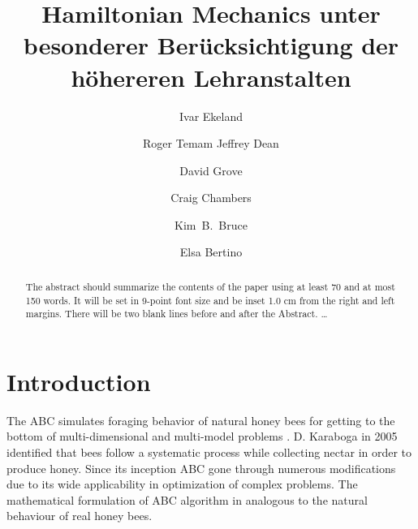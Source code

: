 \documentclass{svproc}
\begin{document}
\mainmatter              %
%
\title{Hamiltonian Mechanics unter besonderer Ber\"ucksichtigung der
h\"ohereren Lehranstalten}
%
%
\author{Ivar Ekeland \and Roger Temam
Jeffrey Dean \and David Grove \and Craig Chambers \and Kim~B.~Bruce \and
Elsa Bertino}
%
%
%

\maketitle              %

\begin{abstract}
The abstract should summarize the contents of the paper
using at least 70 and at most 150 words. It will be set in 9-point
font size and be inset 1.0 cm from the right and left margins.
There will be two blank lines before and after the Abstract. \dots
\end{abstract}

\section{Introduction}\label{sec:intro}
The ABC simulates foraging behavior of natural honey bees for getting to the bottom of multi-dimensional and multi-model problems \cite{kumar2018artificial}. D. Karaboga in 2005 \cite{karaboga2005idea} identified that bees follow a systematic process while collecting nectar in order to produce honey. Since its inception ABC gone through numerous modifications due to its wide applicability in optimization of complex problems. The mathematical formulation of ABC algorithm in analogous to the natural behaviour of real honey bees.
\end{document}
